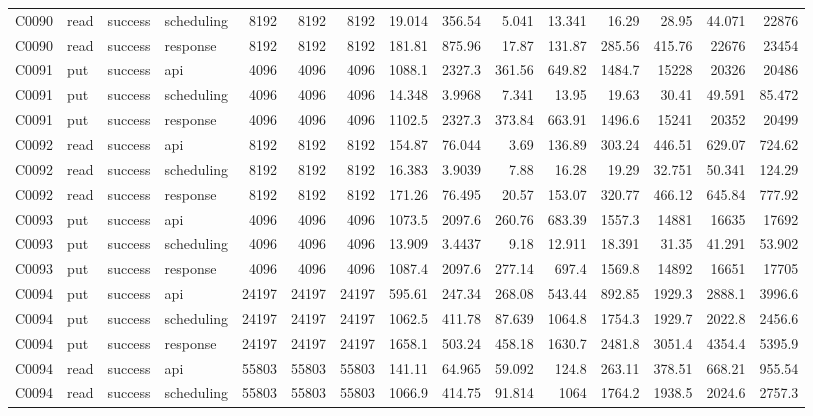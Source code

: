 \begin{landscape}
\begin{longtable}{llllrrrrrrrrrrr}
C0090 & read & success & scheduling & 8192 & 8192 & 8192 & 19.014 & 356.54 & 5.041 & 13.341 & 16.29 & 28.95 & 44.071 & 22876\\
C0090 & read & success & response & 8192 & 8192 & 8192 & 181.81 & 875.96 & 17.87 & 131.87 & 285.56 & 415.76 & 22676 & 23454\\
C0091 & put & success & api & 4096 & 4096 & 4096 & 1088.1 & 2327.3 & 361.56 & 649.82 & 1484.7 & 15228 & 20326 & 20486\\
C0091 & put & success & scheduling & 4096 & 4096 & 4096 & 14.348 & 3.9968 & 7.341 & 13.95 & 19.63 & 30.41 & 49.591 & 85.472\\
C0091 & put & success & response & 4096 & 4096 & 4096 & 1102.5 & 2327.3 & 373.84 & 663.91 & 1496.6 & 15241 & 20352 & 20499\\
C0092 & read & success & api & 8192 & 8192 & 8192 & 154.87 & 76.044 & 3.69 & 136.89 & 303.24 & 446.51 & 629.07 & 724.62\\
C0092 & read & success & scheduling & 8192 & 8192 & 8192 & 16.383 & 3.9039 & 7.88 & 16.28 & 19.29 & 32.751 & 50.341 & 124.29\\
C0092 & read & success & response & 8192 & 8192 & 8192 & 171.26 & 76.495 & 20.57 & 153.07 & 320.77 & 466.12 & 645.84 & 777.92\\
C0093 & put & success & api & 4096 & 4096 & 4096 & 1073.5 & 2097.6 & 260.76 & 683.39 & 1557.3 & 14881 & 16635 & 17692\\
C0093 & put & success & scheduling & 4096 & 4096 & 4096 & 13.909 & 3.4437 & 9.18 & 12.911 & 18.391 & 31.35 & 41.291 & 53.902\\
C0093 & put & success & response & 4096 & 4096 & 4096 & 1087.4 & 2097.6 & 277.14 & 697.4 & 1569.8 & 14892 & 16651 & 17705\\
C0094 & put & success & api & 24197 & 24197 & 24197 & 595.61 & 247.34 & 268.08 & 543.44 & 892.85 & 1929.3 & 2888.1 & 3996.6\\
C0094 & put & success & scheduling & 24197 & 24197 & 24197 & 1062.5 & 411.78 & 87.639 & 1064.8 & 1754.3 & 1929.7 & 2022.8 & 2456.6\\
C0094 & put & success & response & 24197 & 24197 & 24197 & 1658.1 & 503.24 & 458.18 & 1630.7 & 2481.8 & 3051.4 & 4354.4 & 5395.9\\
C0094 & read & success & api & 55803 & 55803 & 55803 & 141.11 & 64.965 & 59.092 & 124.8 & 263.11 & 378.51 & 668.21 & 955.54\\
C0094 & read & success & scheduling & 55803 & 55803 & 55803 & 1066.9 & 414.75 & 91.814 & 1064 & 1764.2 & 1938.5 & 2024.6 & 2757.3\\

\end{longtable}
\end{landscape}
